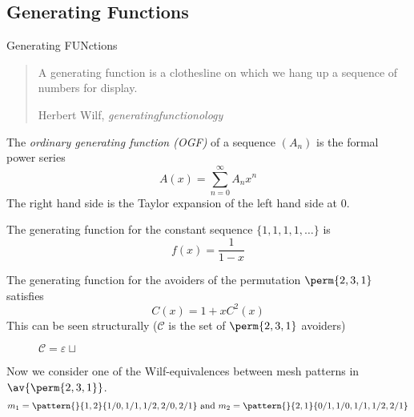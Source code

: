 \subsection{Generating Functions}
\label{sub:Generating Functions}
\begin{frame}{Generating {\huge FUN}ctions}
  \begin{block}{}
    \blockquote[Herbert Wilf, \emph{generatingfunctionology}~\cite{Wilf}]{
    A generating function is a clothesline on which we hang up a sequence of numbers for display.}
  \end{block}
  \begin{definition}
    The \emph{ordinary generating function (OGF)} of a sequence \((A_n)\) is the
    formal power series
    \begin{equation}
      A(x) = \sum_{n=0}^{\infty} A_nx^n
    \end{equation}
    The right hand side is the Taylor expansion of the left hand side at \(0\).
  \end{definition}
\end{frame}
\begin{frame}
  \begin{example}
    The generating function for the constant sequence \(\{1,1,1,1,\dotsc\}\) is
    \begin{equation*}
      f(x) = \frac{1}{1-x}
    \end{equation*}
  \end{example}
\end{frame}
\begin{frame}
  \begin{example}
  The generating function for the avoiders of the permutation \(\perm{2,3,1}\)
  satisfies
  \begin{equation}
    C(x) = 1 +xC^2(x)
  \end{equation}
  This can be seen structurally (\(\mathcal{C}\) is the set of \(\perm{2,3,1}\) avoiders)
  \begin{figure}[!ht]
    \centering
    \(\mathcal{C} = \varepsilon \mathrel{\sqcup}\) 
\end{figure}

\end{example}
\end{frame}
\begin{frame}
  Now we consider one of the Wilf-equivalences between mesh patterns in \(\av{\perm{2,3,1}}\).
  \begin{equation*}
    m_1 = \pattern{}{1,2}{1/0,1/1,1/2,2/0,2/1} \text{ and }
    m_2 = \pattern{}{2,1}{0/1,1/0,1/1,1/2,2/1}
  \end{equation*}
\end{frame}

